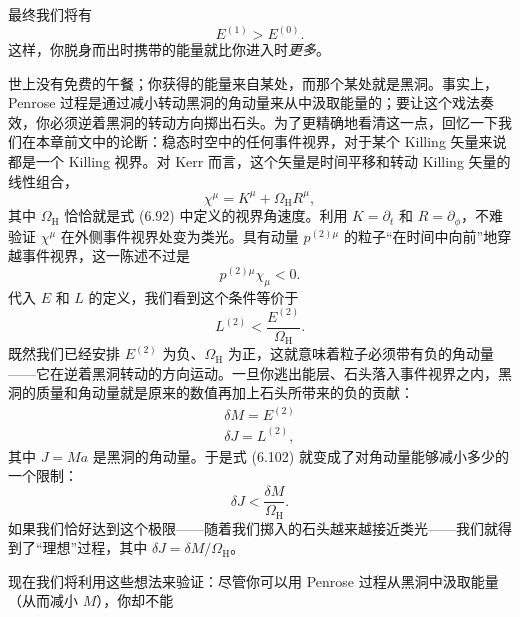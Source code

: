 

最终我们将有
\begin{equation*}
E^{(1)} > E^{(0)}.
\tag{6.99}
\end{equation*}
这样，你脱身而出时携带的能量就比你进入时\emph{更多}。

世上没有免费的午餐；你获得的能量来自某处，而那个某处就是黑洞。事实上，Penrose 过程是通过减小转动黑洞的角动量来从中汲取能量的；要让这个戏法奏效，你必须逆着黑洞的转动方向掷出石头。为了更精确地看清这一点，回忆一下我们在本章前文中的论断：稳态时空中的任何事件视界，对于某个 Killing 矢量来说都是一个 Killing 视界。对 Kerr 而言，这个矢量是时间平移和转动 Killing 矢量的线性组合，
\begin{equation*}
\chi^{\mu} = K^{\mu} + \Omega_{\mathrm{H}}R^{\mu},
\tag{6.100}
\end{equation*}
其中 $\Omega_{\mathrm{H}}$ 恰恰就是式 (6.92) 中定义的视界角速度。利用 $K=\partial_t$ 和 $R=\partial_\phi$，不难验证 $\chi^{\mu}$ 在外侧事件视界处变为类光。具有动量 $p^{(2)\mu}$ 的粒子“在时间中向前”地穿越事件视界，这一陈述不过是
\begin{equation*}
p^{(2)\mu}\chi_{\mu} < 0.
\tag{6.101}
\end{equation*}
代入 $E$ 和 $L$ 的定义，我们看到这个条件等价于
\begin{equation*}
L^{(2)} < \frac{E^{(2)}}{\Omega_{\mathrm{H}}}.
\tag{6.102}
\end{equation*}
既然我们已经安排 $E^{(2)}$ 为负、$\Omega_{\mathrm{H}}$ 为正，这就意味着粒子必须带有负的角动量——它在逆着黑洞转动的方向运动。一旦你逃出能层、石头落入事件视界之内，黑洞的质量和角动量就是原来的数值再加上石头所带来的负的贡献：
\begin{gather*}
\delta M = E^{(2)}\\
\delta J = L^{(2)},
\tag{6.103}
\end{gather*}
其中 $J=Ma$ 是黑洞的角动量。于是式 (6.102) 就变成了对角动量能够减小多少的一个限制：
\begin{equation*}
\delta J < \frac{\delta M}{\Omega_{\mathrm{H}}}.
\tag{6.104}
\end{equation*}
如果我们恰好达到这个极限——随着我们掷入的石头越来越接近类光——我们就得到了“理想”过程，其中 $\delta J = \delta M/\Omega_{\mathrm{H}}$。

现在我们将利用这些想法来验证：尽管你可以用 Penrose 过程从黑洞中汲取能量（从而减小 $M$），你却不能

